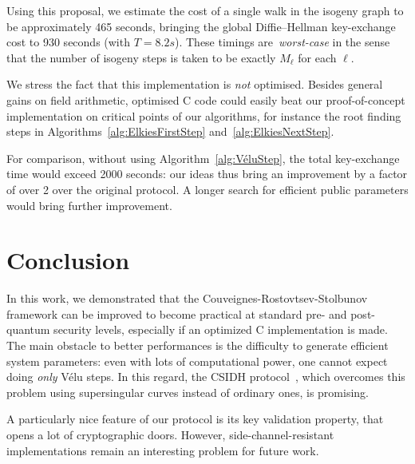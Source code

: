 \documentclass{llncs}
\begin{document}
Using this proposal, we estimate the cost of a single walk in the
isogeny graph to be approximately 465 seconds, bringing the global
Diffie--Hellman key-exchange cost to 930 seconds (with $T = 8.2s$).
These timings are~\emph{worst-case}
in the sense that the number of isogeny steps is taken
to be exactly $M_\ell$ for each $\ell$.

We stress the fact that this implementation
is \emph{not} optimised. Besides general gains on field arithmetic,
optimised C code could easily beat our proof-of-concept implementation
on critical points of our algorithms, for instance the root finding steps 
in Algorithms~\ref{alg:ElkiesFirstStep}
and~\ref{alg:ElkiesNextStep}.

For comparison, without using Algorithm~\ref{alg:VéluStep}, the
total key-exchange time would exceed 2000 seconds:
our ideas thus bring an improvement by a factor of over 2 over the
original protocol. A longer search for efficient public
parameters would bring further improvement.

\section{Conclusion}

In this work, we demonstrated that the Couveignes-Rostovtsev-Stolbunov
framework can be improved to become practical at standard pre- and
post-quantum security levels, especially if an optimized C implementation
is made. The main obstacle to better performances is the difficulty
to generate efficient system parameters: even with lots of computational
power, one cannot expect doing \emph{only} Vélu steps. In this regard,
the CSIDH protocol~\cite{csidh}, which overcomes this problem using
supersingular curves instead of ordinary ones, is promising.

A particularly nice feature of our protocol is its key validation property,
that opens a lot of cryptographic doors. However, side-channel-resistant
implementations remain an interesting problem for future work.




\end{document}
